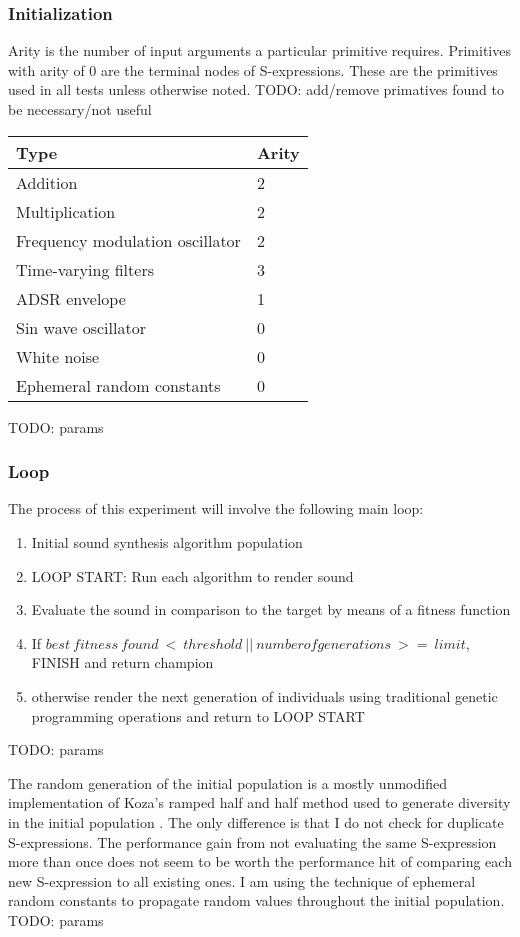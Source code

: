 \documentclass[12pt]{article}
\begin{document}
\subsubsection{Initialization}\label{TMINIT}
Arity is the number of input arguments a particular primitive requires. Primitives with arity of $0$ are the terminal nodes of S-expressions. These are the primitives used in all tests unless otherwise noted. TODO: add/remove primatives found to be necessary/not useful
\begin{center}
\begin{tabular}{ | l | l | } \hline
Type & Arity \\ \hline
Addition & 2 \\ \hline
Multiplication & 2 \\ \hline
Frequency modulation oscillator & 2 \\ \hline
Time-varying filters & 3 \\ \hline
ADSR envelope & 1 \\ \hline
Sin wave oscillator & 0 \\ \hline
White noise & 0 \\ \hline
Ephemeral random constants & 0 \\ \hline
\end{tabular}
\end{center}
TODO: params
\subsubsection{Loop}
The process of this experiment will involve the following main loop:
\begin{enumerate}
\item
Initial sound synthesis algorithm population
\item
LOOP START:
Run each algorithm to render sound
\item
Evaluate the sound in comparison to the target by means of a fitness function
\item
If $best\ fitness\ found\ <\ threshold\ ||\ number of generations\ >=\ limit$, FINISH and return champion
\item
otherwise render the next generation of individuals using traditional genetic programming operations and return to LOOP START
\end{enumerate}
TODO: params

The random generation of the initial population is a mostly unmodified implementation of Koza's ramped half and half method used to generate diversity in the initial population \citep{koza1992genetic}. The only difference is that I do not check for duplicate S-expressions. The performance gain from not evaluating the same S-expression more than once does not seem to be worth the performance hit of comparing each new S-expression to all existing ones. I am using the technique of ephemeral random constants to propagate random values throughout the initial population.
TODO: params
\end{document}
